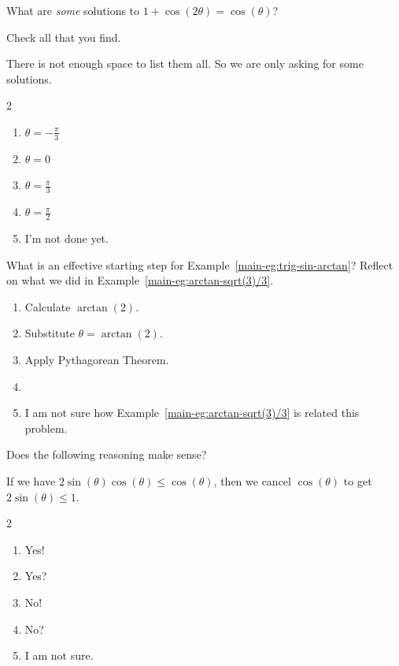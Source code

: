 \documentclass[aspectratio=169, 14pt, t]{beamer}  %
\begin{document}
\begin{poll}
  What are \emph{some} solutions to \(1 + \cos(2\theta) = \cos(\theta)\)?

  Check all that you find.

  {\footnotesize There is not enough space to list them all. So we are only asking for some solutions.}

  \bigskip

  \begin{multicols}{2}
    \begin{enumerate}
      \item \(\theta = -\frac{\pi}{3}\)
      \item \(\theta = 0\)
      \item \(\theta = \frac{\pi}{3}\)
      \item \(\theta = \frac{\pi}{2}\)
        \columnbreak
      \item I'm not done yet.
    \end{enumerate}
  \end{multicols}
\end{poll}

\begin{poll}
  What is an effective starting step for Example~\ref{main-eg:trig-sin-arctan}?  Reflect on what we did in Example~\ref{main-eg:arctan-sqrt(3)/3}.

  \begin{enumerate}
    \item Calculate \(\arctan(2)\).
    \item Substitute \(\theta = \arctan(2)\).
    \item Apply Pythagorean Theorem.
    \item
    \item I am not sure how Example~\ref{main-eg:arctan-sqrt(3)/3} is related this problem.
  \end{enumerate}
\end{poll}

\begin{poll}
  Does the following reasoning make sense?

  \begin{center}
    If we have \(2 \sin(\theta) \cos(\theta) \le \cos(\theta)\), then we cancel \(\cos(\theta)\) to get \(2 \sin(\theta) \le 1\).
  \end{center}

  \begin{multicols}{2}
    \begin{enumerate}
      \item Yes!
      \item Yes?
        \columnbreak
      \item No!
      \item No?
      \item I am not sure.
    \end{enumerate}
  \end{multicols}
\end{poll}
\end{document}
